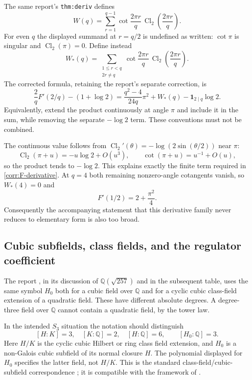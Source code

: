 The same report's \texttt{thm:deriv} defines
\[
 W(q)=\sum_{r=1}^{q-1}
       \cot\frac{2\pi r}{q}\,
       \operatorname{Cl}_2\left(\frac{2\pi r}{q}\right).
\]
For even $q$ the displayed summand at $r=q/2$ is undefined as written:
$\cot\pi$ is singular and $\operatorname{Cl}_2(\pi)=0$.
Define instead
\begin{equation}\label{corr:W-definition}
 W_*(q)=\sum_{\substack{1\leq r<q\\2r\ne q}}
       \cot\frac{2\pi r}{q}\,
       \operatorname{Cl}_2\left(\frac{2\pi r}{q}\right).
\end{equation}
The corrected formula, retaining the report's separate correction, is
\begin{equation}\label{corr:F-derivative}
 \frac2qF'(2/q)-(1+\log2)
    =\frac{q^2-4}{24q}\pi^2+W_*(q)
                                  -\mathbf1_{2\mid q}\log2.
\end{equation}
Equivalently, extend the product continuously at angle $\pi$ and
include it in the sum, while removing the separate $-\log2$ term.
These conventions must not be combined.

The continuous value follows from
$\operatorname{Cl}_2'(\theta)=-\log(2\sin(\theta/2))$ near $\pi$:
\[
 \operatorname{Cl}_2(\pi+u)=-u\log2+O(u^3),\qquad
 \cot(\pi+u)=u^{-1}+O(u),
\]
so the product tends to $-\log2$.  This explains exactly the finite
term required in \eqref{corr:F-derivative}.
At $q=4$ both remaining nonzero-angle cotangents vanish, so
$W_*(4)=0$ and
\begin{equation}\label{corr:F-derivative-half}
 F'(1/2)=2+\frac{\pi^2}{4}.
\end{equation}
Consequently the accompanying statement that this derivative family
never reduces to elementary form is also too broad.

\subsection{Cubic subfields, class fields, and the regulator coefficient}
\label{corr:stark-fields}

The report
, in its discussion of
$\mathbb Q(\sqrt{257})$ and in the subsequent table, uses the same
symbol $H_0$ both for a cubic field over $\mathbb Q$ and for a cyclic
cubic class-field extension of a quadratic field.  These have different
absolute degrees.  A degree-three field over $\mathbb Q$ cannot
contain a quadratic field, by the tower law.

In the intended $S_3$ situation the notation should distinguish
\[
 [H:K]=3,\quad[K:\mathbb Q]=2,\quad[H:\mathbb Q]=6,
 \qquad [H_0:\mathbb Q]=3.
\]
Here $H/K$ is the cyclic cubic Hilbert or ring class field extension,
and $H_0$ is a non-Galois cubic subfield of its normal closure $H$.
The polynomial displayed for $H_0$ specifies the latter field, not
$H/K$.  This is the standard class-field/cubic-subfield correspondence
\cite{MilneCFT}; it is compatible with the framework of
\cite{RadchenkoZagier2023}.

